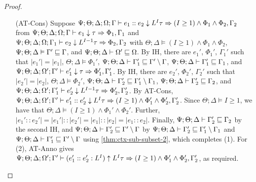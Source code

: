 \begin{proof}
\begin{itemize}
  \item[(AT-Cons)] Suppose $\Psi ; \Theta ; \Delta ; \Omega ; \Gamma\vdash e_1 :: e_2 \downarrow L^I \tau \Rightarrow (I \geq 1) \wedge \Phi_1 \wedge \Phi_2, \Gamma_2$
  from $\Psi ; \Theta ; \Delta ; \Omega ; \Gamma\vdash e_1 \downarrow \tau \Rightarrow \Phi_1, \Gamma_1$ and 
       $\Psi ; \Theta ; \Delta ; \Omega ; \Gamma_1\vdash e_2 \downarrow L^{I-1} \tau \Rightarrow \Phi_2, \Gamma_2$ with 
       $\Theta ; \Delta \vDash (I \geq 1) \wedge \Phi_1 \wedge \Phi_2$, 
       $\Psi ; \Theta ; \Delta \vDash \Gamma' \sqsubseteq \Gamma$, and 
       $\Psi ; \Theta ; \Delta \vdash \Omega' \sqsubseteq \Omega$.
       By IH, there are $e_1'$, $\Phi_1'$, $\Gamma_1'$ such that $|e_1'| = |e_1|$, 
       $\Theta ; \Delta \vDash \Phi_1'$, 
       $\Psi ; \Theta ; \Delta \vdash \Gamma_1' \sqsubseteq \Gamma' \setminus \Gamma$, 
       $\Psi ; \Theta ; \Delta \vdash \Gamma_1' \sqsubseteq \Gamma_1$, and
       $\Psi ; \Theta ; \Delta ; \Omega' ; \Gamma' \vdash e_1' \downarrow \tau \Rightarrow \Phi_1',\Gamma_1'$.
       By IH, there are $e_2'$, $\Phi_2'$, $\Gamma_2'$ such that $|e_2'| = |e_2|$,
       $\Theta ; \Delta \vDash \Phi_2'$,
       $\Psi ; \Theta ; \Delta \vdash \Gamma_2' \sqsubseteq \Gamma_1' \setminus \Gamma_1$,
       $\Psi ; \Theta ; \Delta \vdash \Gamma_2' \sqsubseteq \Gamma_2$, and
       $\Psi ; \Theta ; \Delta ; \Omega' ; \Gamma_1' \vdash e_2' \downarrow L^{I-1} \tau \Rightarrow \Phi_2',\Gamma_2'$.
       By AT-Cons,
       $\Psi ; \Theta ; \Delta ; \Omega' ; \Gamma' \vdash e_1' :: e_2' \downarrow L^I \tau \Rightarrow (I \geq 1) \wedge \Phi_1' \wedge \Phi_2',\Gamma_2'$.
       Since $\Theta ; \Delta \vDash I \geq 1$, we have that $\Theta ; \Delta \vDash (I \geq 1) \wedge \Phi_1' \wedge \Phi_2'$. Further, $|e_1' :: e_2'| = |e_1'| :: |e_2'| = |e_1| :: |e_2| = |e_1 :: e_2|$. Finally, $\Psi ; \Theta ; \Delta \vdash \Gamma_2' \sqsubseteq \Gamma_2$ by the second IH, and $\Psi ; \Theta ; \Delta \vdash \Gamma_2' \sqsubseteq \Gamma' \setminus \Gamma$ by $\Psi ; \Theta ; \Delta \vdash \Gamma_2' \sqsubseteq \Gamma_1' \setminus \Gamma_1$ and $\Psi ; \Theta ; \Delta \vdash \Gamma_1' \sqsubseteq \Gamma' \setminus \Gamma$ using \autoref{thm:ctx-sub-subset-2}, which completes (1). For (2), AT-Anno gives
       $\Psi ; \Theta ; \Delta ; \Omega' ; \Gamma' \vdash (e_1' :: e_2' : L^I) \uparrow L^I \tau \Rightarrow (I \geq 1) \wedge \Phi_1' \wedge \Phi_2',\Gamma_2'$, as required.
  

\end{itemize}
\end{proof}
